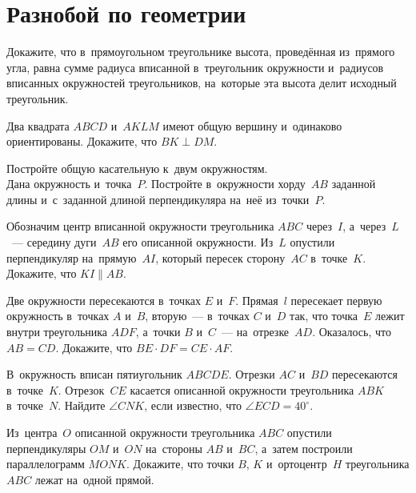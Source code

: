 
\section*{Разнобой по геометрии}


\begin{problems}

\item
Докажите, что в~прямоугольном треугольнике высота, проведённая из~прямого угла,
равна сумме радиуса вписанной в~треугольник окружности и~радиусов вписанных
окружностей треугольников, на~которые эта высота делит исходный треугольник.

\item
Два квадрата $ABCD$ и~$AKLM$ имеют общую вершину и~одинаково ориентированы.
Докажите, что $BK \perp DM$.

\item
\sp
Постройте общую касательную к~двум окружностям.
\\
\sp Дана окружность и~точка~$P$.
Постройте в~окружности хорду~$AB$ заданной длины и~с~заданной длиной
перпендикуляра на~неё из~точки~$P$.

\item
Обозначим центр вписанной окружности треугольника $ABC$ через~$I$,
а~через~$L$~--- середину дуги~$AB$ его описанной окружности.
Из~$L$ опустили перпендикуляр на~прямую~$AI$, который пересек сторону~$AC$
в~точке~$K$.
Докажите, что $KI \parallel AB$.

\item
Две окружности пересекаются в~точках $E$ и~$F$.
Прямая~$l$ пересекает первую окружность в~точках $A$ и~$B$, вторую~---
в~точках $C$ и~$D$ так, что точка~$E$ лежит внутри треугольника $ADF$,
а~точки $B$ и~$C$~--- на~отрезке~$AD$.
Оказалось, что $AB = CD$.
Докажите, что $BE \cdot DF = CE \cdot AF$.

\item
В~окружность вписан пятиугольник $ABCDE$.
Отрезки $AC$ и~$BD$ пересекаются в~точке~$K$.
Отрезок~$CE$ касается описанной окружности треугольника $ABK$ в~точке~$N$.
Найдите $\angle CNK$, если известно, что $\angle ECD = 40^\circ$.

\item
Из~центра~$O$ описанной окружности треугольника $ABC$ опустили перпендикуляры
$OM$ и~$ON$ на~стороны $AB$ и~$BC$, а~затем построили параллелограмм $MONK$.
Докажите, что точки $B$, $K$ и~ортоцентр~$H$ треугольника $ABC$ лежат
на~одной прямой.

\end{problems}

